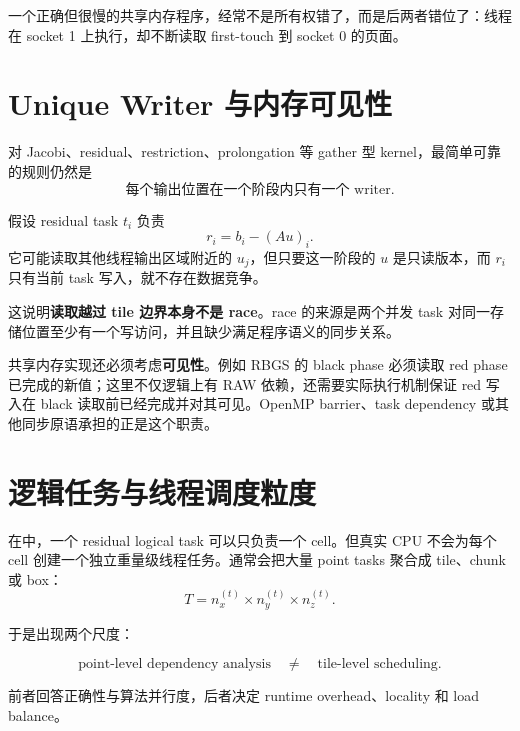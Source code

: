 一个正确但很慢的共享内存程序，经常不是所有权错了，而是后两者错位了：线程在 socket 1 上执行，却不断读取 first-touch 到 socket 0 的页面。

\section{Unique Writer 与内存可见性}

对 Jacobi、residual、restriction、prolongation 等 gather 型 kernel，最简单可靠的规则仍然是
\begin{equation}
\boxed{
\text{每个输出位置在一个阶段内只有一个 writer}.
}
\label{eq:shared-memory-unique-writer}
\end{equation}

假设 residual task $t_i$ 负责
\begin{equation}
r_i=b_i-(Au)_i.
\end{equation}
它可能读取其他线程输出区域附近的 $u_j$，但只要这一阶段的 $u$ 是只读版本，而 $r_i$ 只有当前 task 写入，就不存在数据竞争。

这说明\textbf{读取越过 tile 边界本身不是 race}。race 的来源是两个并发 task 对同一存储位置至少有一个写访问，并且缺少满足程序语义的同步关系。

共享内存实现还必须考虑\textbf{可见性}。例如 RBGS 的 black phase 必须读取 red phase 已完成的新值；这里不仅逻辑上有 RAW 依赖，还需要实际执行机制保证 red 写入在 black 读取前已经完成并对其可见。OpenMP barrier、task dependency 或其他同步原语承担的正是这个职责。

\section{逻辑任务与线程调度粒度}

在中，一个 residual logical task 可以只负责一个 cell。但真实 CPU 不会为每个 cell 创建一个独立重量级线程任务。通常会把大量 point tasks 聚合成 tile、chunk 或 box：
\begin{equation}
T
=
n_x^{(t)}
\times
n_y^{(t)}
\times
n_z^{(t)}.
\end{equation}

于是出现两个尺度：

\begin{equation}
\boxed{
\text{point-level dependency analysis}
\quad\neq\quad
\text{tile-level scheduling}.
}
\label{eq:shared-memory-two-granularities}
\end{equation}

前者回答正确性与算法并行度，后者决定 runtime overhead、locality 和 load balance。

